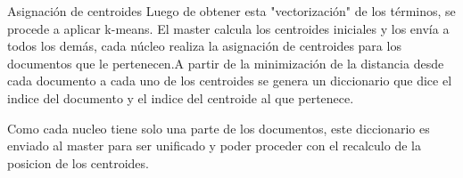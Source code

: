 \documentclass[journal]{IEEEtran}
\begin{document}
Asignación de centroides
Luego de obtener esta "vectorización" de los términos, se procede a aplicar k-means. El master calcula los centroides iniciales y los envía a todos los demás, cada núcleo realiza la asignación
de centroides para los documentos que le pertenecen.A partir de la minimización de la distancia
desde cada documento a cada uno de los centroides se genera un diccionario que dice el indice del documento y el indice del centroide al que pertenece.

Como cada nucleo tiene solo una parte de los documentos, este diccionario es enviado al master para ser unificado y poder proceder con el recalculo de la posicion de los centroides.
\end{document}
